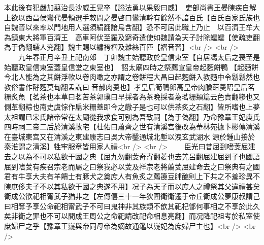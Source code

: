 本此後有犯嚴加翦治長沙威王晃卒【謚法勇以果毅曰威】　吏部尚書王晏陳疾自解上欲以西昌侯鸞代晏領選手敕問之晏啓曰鸞清幹有餘然不諳百氏【百氏百家氏族也自魏晉以來率以門地用人選須絹翻諳烏含翻】恐不可居此職上乃止　以百濟王牟大為鎮東大將軍百濟王　高車阿伏至羅及窮奇遣使如魏請為天子討除蠕蠕【使疏吏翻為于偽翻蠕人兖翻】魏主賜以繡袴褶及雜絲百匹【褶音習】<br />
<br />
　　九年春正月辛丑上祀南郊　丁卯魏主始聽政於皇信東室【自居馮太后之喪至是始聽政皇信東室蓋皇信堂之東室也】　詔太廟四時之祭薦宣皇帝起麪餅鴨【起麪餅今北人能為之其餅浮軟以卷肉噉之亦謂之卷餅程大昌曰起麪餅入教麪中令鬆鬆然也教俗書作酵麪莫甸翻孟詵曰音郝肉羮也】孝皇后筍鴨卵高皇帝肉膾葅羮昭皇后茗粣炙魚【茗茶也本草曰茗苦茶郭璞曰早採者為茶晩採者為茗粣類篇云色責翻糝也又側革翻粽也南史虞悰作扁米粣蓋即今之饊子是也可以供茶炙之石翻】皆所嗜也上夢太祖謂已宋氏諸帝常在太廟從我求食可别為吾致祠【為于偽翻】乃命豫章王妃庾氏四時祠二帝二后於清溪故宅【杜佑曰蕭齊之世有清溪宫後改為華林苑據卞彬傳清溪在臺城東宫又在清溪之東建康志曰吳大帝鑿通城北塹以洩玄武湖水源於鍾山接於秦淮謂之清溪】牲牢服章皆用家人禮<br />
<br />
　　臣光曰昔屈到嗜芰屈建去之以為不可以私欲干國之典【屈九勿翻芰奇寄翻菱也去羌呂翻屈建屈到子也國語屈到嗜芰有疾召宗老而屬之曰祭我必以芰及祥宗老將薦芰屈建命去之曰祭典有之國君有牛享大夫有羊饋士有豚犬之奠庶人有魚炙之薦籩豆脯醢則上下共之不羞珍異不陳庶侈夫子不以其私欲干國之典遂不用】况子為天子而以庶人之禮祭其父違禮甚矣衛成公欲祀相甯武子猶非之【左傳僖三十一年狄圍衛衛遷于帝丘衛成公夢康叔謂己曰相奪予享公命祀相甯武子不可曰鬼神非其族類不歆其祀杞鄫何事相之不享於此久矣非衛之罪也不可以間成王周公之命祀請改祀命相息亮翻】而况降祀祖考於私室使庶婦尸之乎【豫章王嶷與帝同母帝為嫡故通鑑以嶷妃為庶婦尸主也】<br />
<br />
